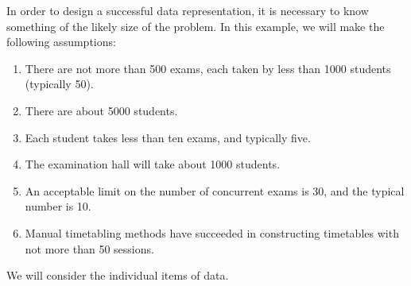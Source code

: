 \documentclass[twoside,11pt]{book}
\begin{document}
In order to design a successful data representation, it is necessary to know
something of the likely size of the problem. In this example, we will make the
following assumptions:

\begin{enumerate}[wide, nosep, label=(\arabic*)]
	\item There are not more than 500 exams, each taken by less than 1000 students (typically 50).
	\item There are about 5000 students.
	\item Each student takes less than ten exams, and typically five.
	\item The examination hall will take about 1000 students.
	\item An acceptable limit on the number of concurrent exams is 30, and the typical number is 10.
	\item Manual timetabling methods have succeeded in constructing timetables with not more than 50 sessions.
\end{enumerate}

We will consider the individual items of data.
\end{document}

